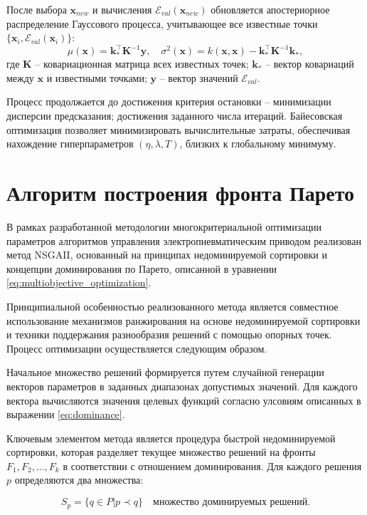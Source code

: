 После выбора $\mathbf{x}_{new}$ и вычисления $\mathcal{E}_{val}(\mathbf{x}_{new})$ обновляется
апостериорное распределение Гауссового процесса, учитывающее все известные
точки $\{\mathbf{x}_i, \mathcal{E}_{val}(\mathbf{x}_i)\}$:
\begin{equation}
\mu(\mathbf{x}) = \mathbf{k}_*^\top \mathbf{K}^{-1} \mathbf{y}, \quad \sigma^2(\mathbf{x}) = k(\mathbf{x}, \mathbf{x}) - \mathbf{k}_*^\top \mathbf{K}^{-1} \mathbf{k}_*,
\end{equation}
где $\mathbf{K}$ -- ковариационная матрица всех известных точек;
$\mathbf{k}_*$ -- вектор ковариаций между $\mathbf{x}$ и известными точками;
$\mathbf{y}$ -- вектор значений $\mathcal{E}_{val}$.

Процесс продолжается до достижения критерия остановки -- минимизации дисперсии предсказания;
достижения заданного числа итераций. Байесовская оптимизация позволяет
минимизировать вычислительные затраты, обеспечивая нахождение
гиперпараметров $(\eta, \lambda, T)$, близких к глобальному минимуму.


\section{Алгоритм построения фронта Парето}\label{sec:ch4/sec5}

В рамках разработанной методологии многокритериальной оптимизации параметров алгоритмов управления электропневматическим приводом реализован
метод NSGAII, основанный на принципах недоминируемой сортировки и концепции доминирования по Парето, описанной в уравнении \ref{eq:multiobjective_optimization}.

Принципиальной особенностью реализованного метода является совместное использование механизмов ранжирования на основе недоминируемой
сортировки и техники поддержания разнообразия решений с помощью опорных точек. Процесс оптимизации осуществляется следующим образом.

Начальное множество решений формируется путем случайной генерации векторов
параметров в заданных диапазонах допустимых значений. Для каждого 
вектора вычисляются значения целевых функций согласно улсовиям описанных в выражении \ref{eq:dominance}. 

Ключевым элементом метода является процедура быстрой недоминируемой сортировки, которая разделяет текущее множество решений
на фронты $F_1, F_2, ..., F_k$ в соответствии с отношением доминирования. Для каждого решения $p$ определяются два множества:

\begin{equation*}
S_p = \{q \in P | p \prec q\} \quad \text{множество доминируемых решений}.
\end{equation*}

